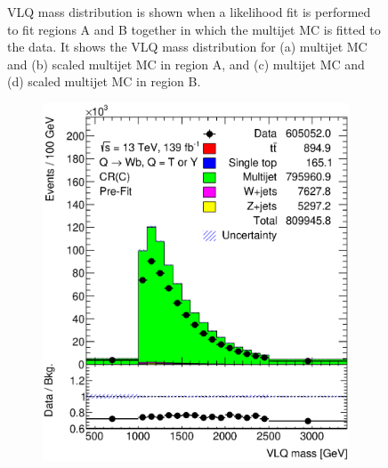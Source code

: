 \begin{figure}[hbt!]
\begin{subfigure}{.35\textwidth}
		\caption{}
	\end{subfigure}
	\caption{VLQ mass distribution is shown when a likelihood fit is performed to fit regions A and B together in which the multijet MC is fitted to the data. It shows the VLQ mass distribution for (a) multijet MC and (b) scaled multijet MC in region A, and (c) multijet MC and (d) scaled multijet MC in region B.}
	\label{fig:app:ab:vlqm}
\end{figure}



\begin{figure}[hbt!]
	\centering
	\graphicspath{{figs/appendix/scaledmultijet/CDVLQM/}}
	\begin{subfigure}{.35\textwidth}
		\centering
		\includegraphics[width=\linewidth,height=\textheight,keepaspectratio]{CR_C_VLQM.eps}
		\caption{}
	\end{subfigure}\hspace{0.6cm}
	\begin{subfigure}{.35\textwidth}
		\centering

\end{subfigure}
\end{figure}
